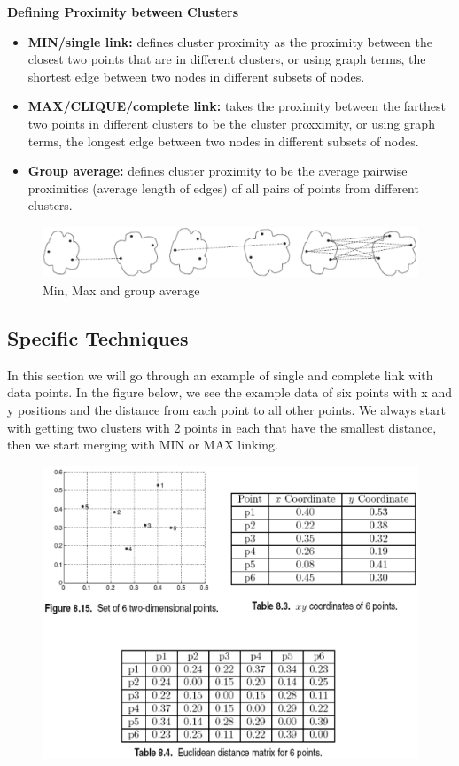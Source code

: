 		\clearpage
		{\bf Defining Proximity between Clusters}
		\begin{itemize}
			\item {\bf MIN/single link:} defines cluster proximity as the proximity between the closest
			two points that are in different clusters, or using graph terms, the shortest edge between
			two nodes in different subsets of nodes. 
			\item {\bf MAX/CLIQUE/complete link:} takes the proximity between the farthest two points in different
			clusters to be the cluster proxximity, or using graph terms, the longest edge between 
			two nodes in different subsets of nodes. 
			\item {\bf Group average:} defines cluster proximity to be the average pairwise proximities
			(average length of edges) of all pairs of points from different clusters. 
		\end{itemize}

		\begin{figure}[H]
			\centering
			\includegraphics[width=\textwidth]{pics/minmax.png}
			\caption{Min, Max and group average}
		\end{figure}

		\clearpage
		\subsection{Specific Techniques}

		In this section we will go through an example of single and complete link with 
		data points. In the figure below, we see the example data of six points with x and y 
		positions and the distance from each point to all other points. We always start with 
		getting two clusters with 2 points in each that have the smallest distance, then 
		we start merging with MIN or MAX linking.
			
			\begin{figure}[H]
				\centering
				\includegraphics[scale=0.28]{pics/datapoints.png}
			\end{figure}

